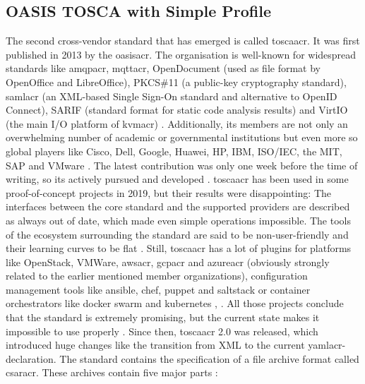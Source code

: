 \subsection{OASIS TOSCA with Simple Profile}
The second cross-vendor standard that has emerged is called \gls{toscaacr}. It was first published in 2013 by the \gls{oasisacr}. The organisation is well-known for widespread standards like \gls{amqpacr}, \gls{mqttacr}, OpenDocument (used as file format by OpenOffice and LibreOffice), PKCS\#11 (a public-key cryptography standard), \gls{samlacr} (an XML-based Single Sign-On standard and alternative to OpenID Connect), SARIF (standard format for static code analysis results) and VirtIO (the main I/O platform of \gls{kvmacr}) \cite{oasis_standards}. Additionally, its members are not only an overwhelming number of academic or governmental institutions but even more so global players like Cisco, Dell, Google, Huawei, HP, IBM, ISO/IEC, the MIT, SAP and VMware \cite{oasis_tosca_members} \cite{oasis_tosca_obligations} \cite{oasis_members}. The latest contribution was only one week before the time of writing, so its actively pursued and developed \cite{tosca_standard_v2} \cite{tosca_releases}.
\newline
\gls{toscaacr} has been used in some proof-of-concept projects \cite{dsl_for_iac} in 2019, but their results were disappointing: The interfaces between the core standard and the supported providers are described as always out of date, which made even simple operations impossible. The tools of the ecosystem surrounding the standard are said to be non-user-friendly and their learning curves to be flat \cite{adminmagazin_aria_tosca}.
Still, \gls{toscaacr} has a lot of plugins for platforms like OpenStack, VMWare, \gls{awsacr}, \gls{gcpacr} and \gls{azureacr} (obviously strongly related to the earlier mentioned member organizations), configuration management tools like ansible, chef, puppet and saltstack or container orchestrators like docker swarm and kubernetes \cite{opentosca_presentation} \cite{adminmagazin_aria_tosca}, \cite{vmware_tosca_components}.
All those projects conclude that the standard is extremely promising, but the current state makes it impossible to use properly \cite{adminmagazin_aria_tosca}.
\newline
Since then, \gls{toscaacr} 2.0 was released, which introduced huge changes like the transition from XML to the current \gls{yamlacr}-declaration.
\newline
The standard contains the specification of a file archive format called \gls{csaracr}. These archives contain five major parts \cite{opentosca_how_to_csar}:
